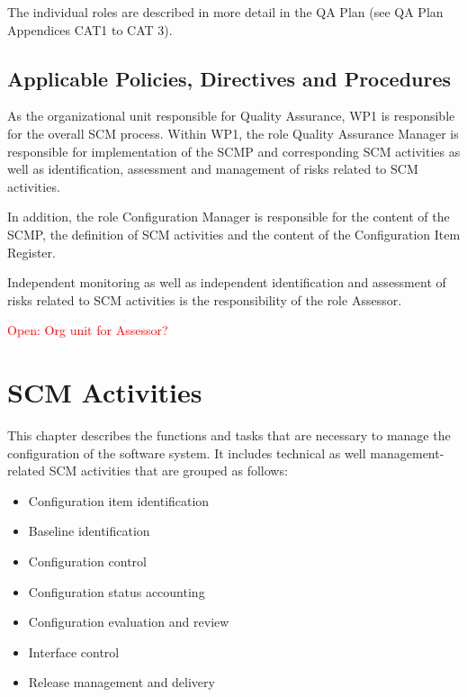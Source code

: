 \documentclass{template/openetcs_article}
\begin{document}
The individual roles are described in more detail in the QA Plan (see QA Plan Appendices CAT1 to CAT 3).


\subsection{Applicable Policies, Directives and Procedures} %
\label{sec:Applicable Policies, Directives and Procedures}

As the organizational unit responsible for Quality Assurance, WP1 is responsible for the overall SCM process. Within WP1, the role Quality Assurance Manager is responsible for implementation of the SCMP and corresponding SCM activities as well as identification, assessment and management of risks related to SCM activities.

In addition, the role Configuration Manager is responsible for the content of the SCMP, the definition of SCM activities and the content of the Configuration Item Register.

Independent monitoring as well as independent identification and assessment of risks related to SCM activities is the responsibility of the role Assessor.

\textcolor{red}{Open: Org unit for Assessor?}

\newpage


\section{SCM Activities} %
\label{sec:SCM Activities}

This chapter describes the functions and tasks that are necessary to manage the configuration of the software system. It includes technical as well management-related SCM activities that are grouped as follows:

\vspace{-10pt}
\begin{itemize}
\item Configuration item identification
\item Baseline identification
\item Configuration control
\item Configuration status accounting
\item Configuration evaluation and review
\item Interface control
\item Release management and delivery
\end{itemize}
\end{document}

